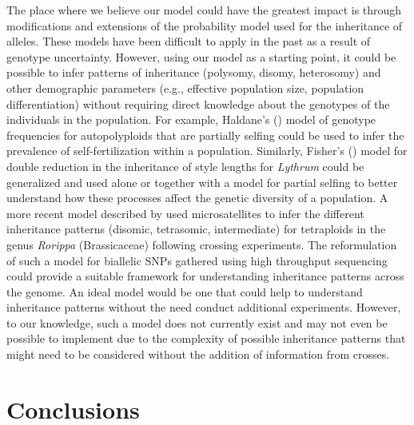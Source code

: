 \documentclass[11pt,english,letterpaper,oneside]{article}
\begin{document}
The place where we believe our model could have the greatest impact is through modifications and extensions of the probability model used for the inheritance of alleles. These models have been difficult to apply in the past as a result of genotype uncertainty. However, using our model as a starting point, it could be possible to infer patterns of inheritance (polysomy, disomy, heterosomy) and other demographic parameters (e.g., effective population size, population differentiation) without requiring direct knowledge about the genotypes of the individuals in the population. For example, Haldane's (\citeyear{haldane1930autopolyploids}) model of genotype frequencies for autopolyploids that are partially selfing could be used to infer the prevalence of self-fertilization within a population. Similarly, Fisher's (\citeyear{fisher1943doublereduction}) model for double reduction in the inheritance of style lengths for \textit{Lythrum} could be generalized and used alone or together with a model for partial selfing to better understand how these processes affect the genetic diversity of a population. A more recent model described by \cite{stift2008polyploidInheritance} used microsatellites to infer the different inheritance patterns (disomic, tetrasomic, intermediate) for tetraploids in the genus \textit{Rorippa} (Brassicaceae) following crossing experiments. The reformulation of such a model for biallelic SNPs gathered using high throughput sequencing could provide a suitable framework for understanding inheritance patterns across the genome. An ideal model would be one that could help to understand inheritance patterns without the need conduct additional experiments. However, to our knowledge, such a model does not currently exist and may not even be possible to implement due to the complexity of possible inheritance patterns that might need to be considered without the addition of information from crosses.
\medskip

\section*{Conclusions}      %
\end{document}
